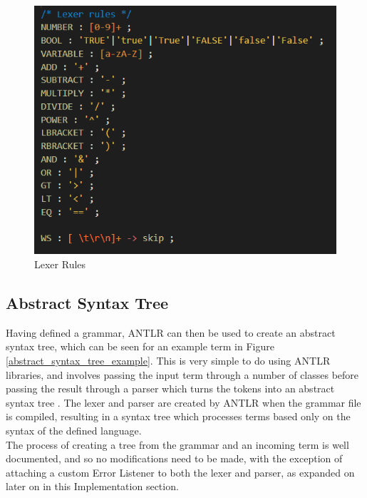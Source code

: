 \documentclass[a4paper,11pt]{report}
\begin{document}
\begin{figure}[p]
\centering
\includegraphics[scale=0.75]{images/lexer_rules}
\caption{Lexer Rules}
\label{lexer_rules}
\end{figure}

\subsection{Abstract Syntax Tree}

Having defined a grammar, ANTLR can then be used to create an abstract syntax tree, which can be seen for an example term in Figure \ref{abstract_syntax_tree_example}. This is very simple to do using ANTLR libraries, and involves passing the input term through a number of classes before passing the result through a parser which turns the tokens into an abstract syntax tree \cite{Tomassetti2007}. The lexer and parser are created by ANTLR when the grammar file is compiled, resulting in a syntax tree which processes terms based only on the syntax of the defined language.\\

The process of creating a tree from the grammar and an incoming term is well documented, and so no modifications need to be made, with the exception of attaching a custom Error Listener to both the lexer and parser, as expanded on later on in this Implementation section.
\end{document}
